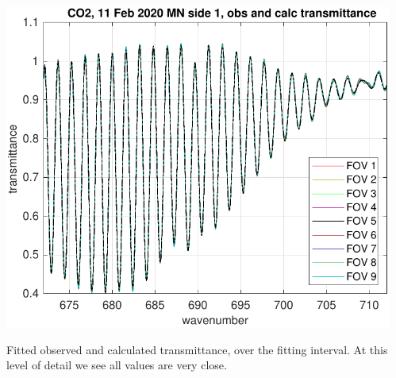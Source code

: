 \documentclass[9pt]{beamer}
\begin{document}
\begin{frame}
\begin{columns}[t]
\begin{column}{0.5\textwidth}
\end{column}
\begin{column}{0.5\textwidth}  
  \begin{centering}
  \includegraphics[width=\textwidth]{02-11_mn_s1_CO2/CO2_obs_and_calc.pdf}
  \end{centering}\vspace{3mm}

Fitted observed and calculated transmittance, over the fitting
interval.  At this level of detail we see all values are very close.

\end{column}
\end{columns}
\end{frame}
\end{document}
